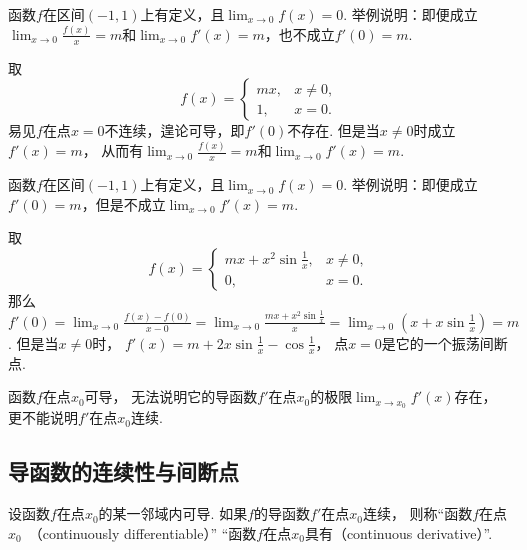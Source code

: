 \begin{example}
函数\(f\)在区间\((-1,1)\)上有定义，且\(\lim_{x\to0} f(x) = 0\).
举例说明：即便成立\(\lim_{x\to0} \frac{f(x)}{x} = m\)和\(\lim_{x\to0} f'(x) = m\)，也不成立\(f'(0) = m\).
\begin{solution}
取\begin{equation*}
	f(x) = \left\{ \begin{array}{cl}
		mx, & x\neq0, \\
		1, & x=0.
	\end{array} \right.
\end{equation*}
易见\(f\)在点\(x=0\)不连续，遑论可导，即\(f'(0)\)不存在.
但是当\(x\neq0\)时成立\(f'(x) = m\)，
从而有\(\lim_{x\to0} \frac{f(x)}{x} = m\)和\(\lim_{x\to0} f'(x) = m\).
\end{solution}
\end{example}
\begin{example}
函数\(f\)在区间\((-1,1)\)上有定义，且\(\lim_{x\to0} f(x) = 0\).
举例说明：即便成立\(f'(0) = m\)，但是不成立\(\lim_{x\to0} f'(x) = m\).
\begin{solution}
取\begin{equation*}
	f(x) = \left\{ \begin{array}{cl}
		mx + x^2 \sin\frac1x, & x\neq0, \\
		0, & x=0.
	\end{array} \right.
\end{equation*}
那么\(f'(0) = \lim_{x\to0} \frac{f(x) - f(0)}{x - 0}
= \lim_{x\to0} \frac{mx + x^2 \sin\frac1x}{x}
= \lim_{x\to0} \left( x + x \sin\frac1x \right)
= m\).
但是当\(x\neq0\)时，
\(f'(x) = m + 2x \sin\frac1x - \cos\frac1x\)，
点\(x=0\)是它的一个振荡间断点.
\end{solution}
\end{example}
\begin{remark}
函数\(f\)在点\(x_0\)可导，
无法说明它的导函数\(f'\)在点\(x_0\)的极限\(\lim_{x \to x_0} f'(x)\)存在，
更不能说明\(f'\)在点\(x_0\)连续.
\end{remark}

\subsection{导函数的连续性与间断点}
\begin{definition}
设函数\(f\)在点\(x_0\)的某一邻域内可导.
如果\(f\)的导函数\(f'\)在点\(x_0\)连续，
则称“函数\(f\)在点\(x_0\)~（continuously differentiable）”
“函数\(f\)在点\(x_0\)具有（continuous derivative）”.
\end{definition}

